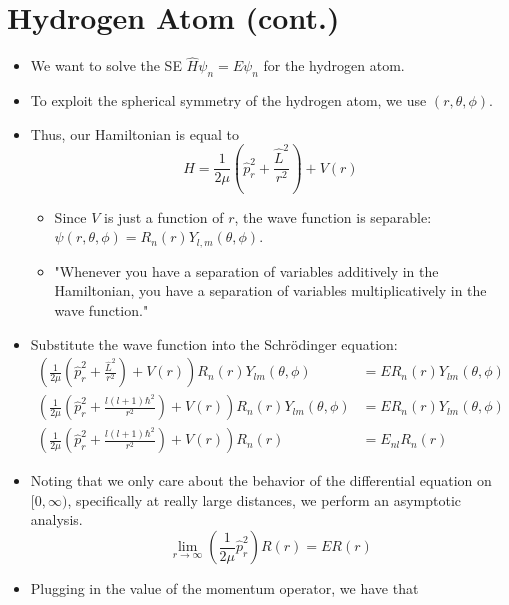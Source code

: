 \documentclass[../notes.tex]{subfiles}
\begin{document}
\section{Hydrogen Atom (cont.)}
\begin{itemize}
    \item {}We want to solve the SE $\hat{H}\psi_n=E\psi_n$ for the hydrogen atom.
    \item To exploit the spherical symmetry of the hydrogen atom, we use $(r,\theta,\phi)$.
    \item Thus, our Hamiltonian is equal to
    \begin{equation*}
        \hat{H} = \frac{1}{2\mu}\left( \hat{p}_r^2+\frac{\hat{L}^2}{r^2} \right)+V(r)
    \end{equation*}
    \begin{itemize}
        \item Since $V$ is just a function of $r$, the wave function is separable: $\psi(r,\theta,\phi)=R_n(r)Y_{l,m}(\theta,\phi)$.
        \item "Whenever you have a separation of variables additively in the Hamiltonian, you have a separation of variables multiplicatively in the wave function."
    \end{itemize}
    \item Substitute the wave function into the Schr\"{o}dinger equation:
    \begin{align*}
        \left( \frac{1}{2\mu}\left( \hat{p}_r^2+\frac{\hat{L}^2}{r^2} \right)+V(r) \right)R_n(r)Y_{lm}(\theta,\phi) &= ER_n(r)Y_{lm}(\theta,\phi)\\
        \left( \frac{1}{2\mu}\left( \hat{p}_r^2+\frac{l(l+1)\hbar^2}{r^2}\right)+V(r) \right)R_n(r)Y_{lm}(\theta,\phi) &= ER_n(r)Y_{lm}(\theta,\phi)\\
        \left( \frac{1}{2\mu}\left( \hat{p}_r^2+\frac{l(l+1)\hbar^2}{r^2} \right)+V(r) \right)R_n(r) &= E_{nl}R_n(r)
    \end{align*}
    \item Noting that we only care about the behavior of the differential equation on $[0,\infty)$, specifically at really large distances, we perform an asymptotic analysis.
    \begin{equation*}
        \lim_{r\to\infty}\left( \frac{1}{2\mu}\hat{p}_r^2 \right)R(r) = ER(r)
    \end{equation*}
    \item Plugging in the value of the momentum operator, we have that
    \begin{align*}

\end{align*}
\end{itemize}
\end{document}
